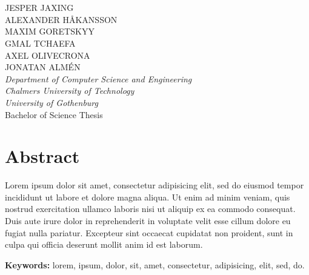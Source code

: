 \large
\begin{flushleft}
\textbf{\varthetitle}\\
\varthesubtitle\\[0.7cm]
\end{flushleft}
JESPER JAXING\\
ALEXANDER HÅKANSSON\\
MAXIM GORETSKYY\\
GMAL TCHAEFA\\
AXEL OLIVECRONA\\
JONATAN ALMÉN\\
\normalsize
\textit{Department of Computer Science and Engineering\\
Chalmers University of Technology\\
University of Gothenburg}\\[0.7cm]
Bachelor of Science Thesis
\setlength{\parskip}{0.5cm}

\thispagestyle{plain}			%
\setlength{\parskip}{0pt plus 1.0pt}
\section*{Abstract}
Lorem ipsum dolor sit amet, consectetur adipisicing elit, sed do eiusmod tempor incididunt ut labore et dolore magna aliqua. Ut enim ad minim veniam, quis nostrud exercitation ullamco laboris nisi ut aliquip ex ea commodo consequat. Duis aute irure dolor in reprehenderit in voluptate velit esse cillum dolore eu fugiat nulla pariatur. Excepteur sint occaecat cupidatat non proident, sunt in culpa qui officia deserunt mollit anim id est laborum.

\vfill
\textbf{Keywords:} lorem, ipsum, dolor, sit, amet, consectetur, adipisicing, elit, sed, do.

\newpage				%
\thispagestyle{empty}
\mbox{}